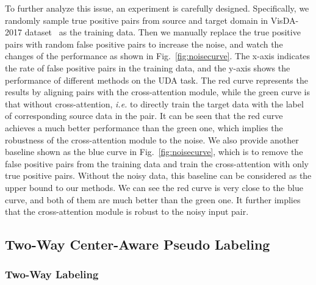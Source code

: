 \documentclass[dvipsnames, svgnames, x11names, table]{article} \usepackage{iclr2022_conference,times}
\begin{document}
\begin{spacing}{1.0}
To further analyze this issue, an experiment is carefully designed. Specifically, we randomly sample true positive pairs from source and target domain in VisDA-2017 dataset~\citep{visda2017} as the training data. Then we manually replace the true positive pairs with random false positive pairs to increase the noise, and watch the changes of the performance as shown in Fig.~\ref{fig:noisecurve}. The x-axis indicates the rate of false positive pairs in the training data, and the y-axis shows the performance of different methods on the UDA task. The red curve represents the results by aligning pairs with the cross-attention module, while the green curve is that without cross-attention, \textit{i.e.} to directly train the target data with the label of corresponding source data in the pair. It can be seen that the red curve achieves a much better performance than the green one, which implies the robustness of the cross-attention module to the noise. We also provide another baseline shown as the blue curve in Fig.~\ref{fig:noisecurve}, which is to remove the false positive pairs from the training data and train the cross-attention with only true positive pairs. Without the noisy data, this baseline can be considered as the upper bound to our methods.
We can see the red curve is very close to the blue curve, and both of them are much better than the green one. It further implies that the cross-attention module is robust to the noisy input pair.





\subsection{Two-Way Center-Aware Pseudo Labeling}
\label{ssec:pseudolabels}



\subsubsection{Two-Way Labeling}


\end{spacing}
\end{document}
